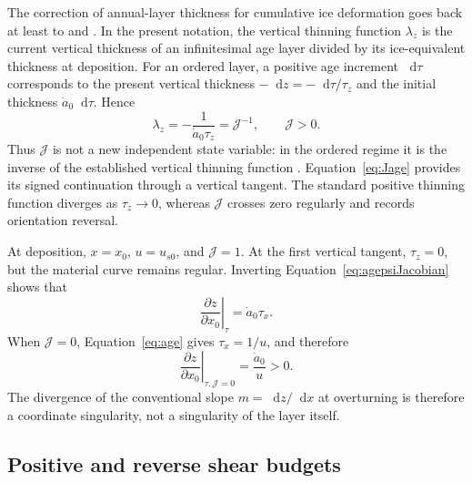 \documentclass[review]{igs}
\newcommand{\parencite}{\citep}
\newcommand{\textcite}{\citet}
\theoremstyle{definition}
\theoremstyle{remark}
\newcommand{\dd}{\mathop{}\!\mathrm{d}}
\newcommand{\Jord}{\mathcal{J}}
\begin{document}
The correction of annual-layer thickness for cumulative ice deformation goes back at least to \textcite{Nye1963} and \textcite{DansgaardJohnsen1969}. In the present notation, the vertical thinning function \(\lambda_z\) is the current vertical thickness of an infinitesimal age layer divided by its ice-equivalent thickness at deposition. For an ordered layer, a positive age increment \(\dd\tau\) corresponds to the present vertical thickness \(-\dd z=-\dd\tau/\tau_z\) and the initial thickness \(\dot a_0\dd\tau\). Hence
\begin{equation}
\boxed{
\lambda_z
=-\frac{1}{\dot a_0\tau_z}
=\Jord^{-1},
\qquad \Jord>0.
}
\label{eq:thinningrelation}
\end{equation}
Thus \(\Jord\) is not a new independent state variable: in the ordered regime it is the inverse of the established vertical thinning function \parencite{Parrenin2013,ParreninChungMartin2025}. Equation~\eqref{eq:Jage} provides its signed continuation through a vertical tangent. The standard positive thinning function diverges as \(\tau_z\rightarrow0\), whereas \(\Jord\) crosses zero regularly and records orientation reversal.

At deposition, \(x=x_0\), \(u=u_{s0}\), and \(\Jord=1\). At the first vertical tangent, \(\tau_z=0\), but the material curve remains regular. Inverting Equation~\eqref{eq:agepsiJacobian} shows that
\begin{equation}
\left.\frac{\partial z}{\partial x_0}\right|_{\tau}
=\dot a_0\tau_x.
\end{equation}
When \(\Jord=0\), Equation~\eqref{eq:age} gives \(\tau_x=1/u\), and therefore
\begin{equation}
\left.\frac{\partial z}{\partial x_0}\right|_{\tau,\Jord=0}
=\frac{\dot a_0}{u}>0.
\end{equation}
The divergence of the conventional slope \(m=\dd z/\dd x\) at overturning is therefore a coordinate singularity, not a singularity of the layer itself.

\subsection{Positive and reverse shear budgets}
\end{document}
